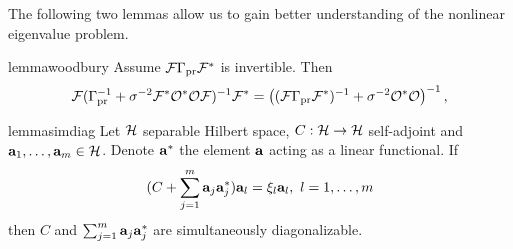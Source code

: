 \documentclass{amsart}
\numberwithin{equation}{section}
\begin{document}
The following two lemmas allow us to gain better understanding of the
nonlinear eigenvalue problem.

\begin{restatable*}{lemma}{woodbury}\label{lemma:twice woodbury}
  Assume $\mathcal{F} \Gamma_{\textup{pr}} \mathcal{F}^*$ is invertible. Then
  \begin{align*}
    \begin{split}
      \mathcal{F}( \Gamma_{\textup{pr}}^{-1} + \sigma^{-2}  \mathcal{F}^* \mathcal{O}^* \mathcal{O} \mathcal{F} )^{-1} \mathcal{F}^* 
      = \left ( (\mathcal{F}\Gamma_{\textup{pr}}\mathcal{F}^*)^{-1} + \sigma^{-2}  \mathcal{O}^* \mathcal{O} \right )^{-1},
    \end{split}
  \end{align*}  
\end{restatable*}




\begin{restatable*}{lemma}{simdiag}\label{lemma:sim diag}
  Let $\mathcal{H}$ separable Hilbert space, $C:\mathcal{H} \to \mathcal{H}$ self-adjoint
  and $\mathbf{a}_1,\dots,\mathbf{a}_m \in \mathcal{H}$. Denote $\mathbf{a}^*$ the element
  $\mathbf{a}$ acting as a linear functional. If
  \begin{equation*}
   (C + \sum_{j=1}^m \mathbf{a}_j\mathbf{a}_j^*) \mathbf{a}_l = \xi_l \mathbf{a}_l,\ l = 1,\dots,m
  \end{equation*}
  then $C$ and $\sum_{j=1}^m \mathbf{a}_j \mathbf{a}_j^*$ are simultaneously
  diagonalizable.
\end{restatable*}
\end{document}
